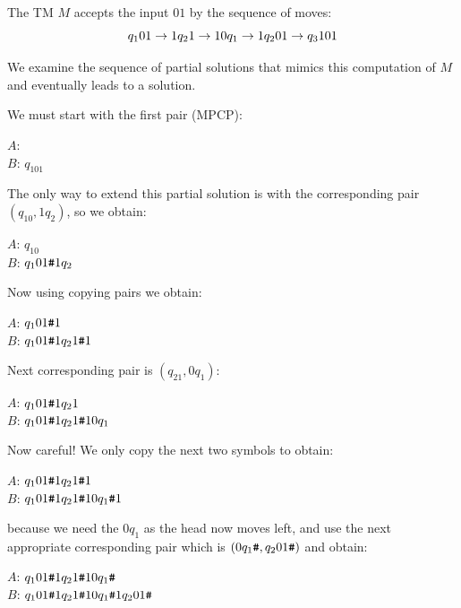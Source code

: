 \begin{frame}
The TM $M$ accepts the input $01$ by the sequence of moves:
$$
q_101\rightarrow
1q_21\rightarrow
10q_1\rightarrow
1q_201\rightarrow
q_3101
$$

We examine the sequence of partial solutions that mimics this
computation of $M$ and eventually leads to a solution.  

We must start with the first pair (MPCP):

$A$: {\hsh} \\
$B$: {\hsh}$q_101${\hsh}

The only way to extend this partial solution is with the corresponding
pair $(q_10,1q_2)$, so we obtain:

$A$: {\hsh}$q_10$ \\
$B$: {\hsh}$q_101{\texttt{\#}}1q_2$ 
\end{frame}

\begin{frame}

{\footnotesize
Now using copying pairs we obtain:

$A$: {\hsh}$q_101{\texttt{\#}}1$ \\
$B$: {\hsh}$q_101{\texttt{\#}}1q_21{\texttt{\#}}1$ 

Next corresponding pair is $(q_21,0q_1)$:

$A$: {\hsh}$q_101{\texttt{\#}}1q_21$ \\
$B$: {\hsh}$q_101{\texttt{\#}}1q_21{\texttt{\#}}10q_1$ 

Now careful!  We only copy the next two symbols to obtain:

$A$: {\hsh}$q_101{\texttt{\#}}1q_21{\texttt{\#}}1$ \\
$B$: {\hsh}$q_101{\texttt{\#}}1q_21{\texttt{\#}}10q_1{\texttt{\#}}1$ 

because we need the $0q_1$ as the head now moves left, and use the
next appropriate corresponding pair which is $(0q_1{\texttt{\#}},q_201{\texttt{\#}})$ and
obtain:

$A$: {\hsh}$q_101{\texttt{\#}}1q_21{\texttt{\#}}10q_1{\texttt{\#}}$ \\
$B$: {\hsh}$q_101{\texttt{\#}}1q_21{\texttt{\#}}10q_1{\texttt{\#}}1q_201{\texttt{\#}}$ 
}
\end{frame}

